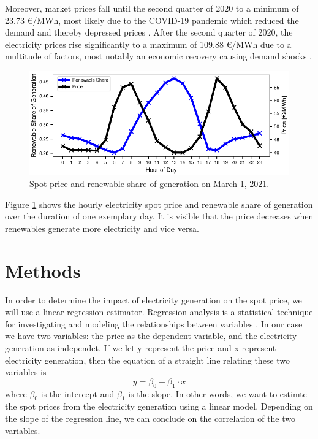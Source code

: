 \documentclass{article}
\begin{document}
Moreover, market prices fall until the second quarter of 2020 to a minimum of 23.73 €/MWh, most likely due to the COVID-19 pandemic which reduced the demand and thereby depressed prices \citep{covid_electricity_systems}.
After the second quarter of 2020, the electricity prices rise significantly to a maximum of 109.88 €/MWh due to a multitude of factors, most notably an economic recovery causing demand shocks \citep{long_covid_energy_prices}. 
\begin{figure}[h]
    \centering
    \includegraphics[width=\columnwidth]{doc/fig/example_day.pdf}
    \caption{Spot price and renewable share of generation on March 1, 2021.}
    \label{fig:example_day}
\end{figure}
Figure \ref{fig:example_day} shows the hourly electricity spot price and renewable share of generation over the duration of one exemplary day. 
It is visible that the price decreases when renewables generate more electricity and vice versa. 

\section{Methods}
In order to determine the impact of electricity generation on the spot price, we will use a linear regression estimator. 
Regression analysis is a statistical technique for investigating and modeling the relationships between variables \citep{montgomery2021introduction}. 
In our case we have two variables: the price as the dependent variable, and the electricity generation as independet.
If we let y represent the price and x represent electricity generation, then the equation of a straight line relating these two variables is 
\begin{equation}
    y = \beta_0 + \beta_1\cdot x
\end{equation}
where $\beta_0$ is the intercept and $\beta_1$ is the slope.
In other words, we want to estimte the spot prices from the electricity generation using a linear model.
Depending on the slope of the regression line, we can conclude on the correlation of the two variables. 
\end{document}
